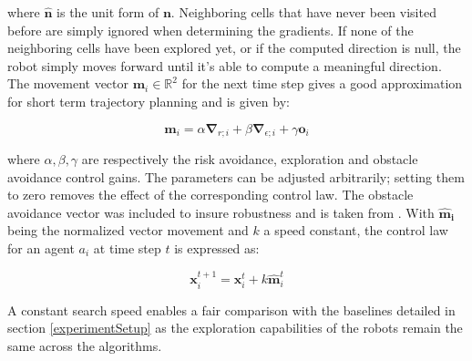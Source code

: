 


where $\bm{\hat{n}}$ is the unit form of $\bm{n}$. Neighboring cells that have never been visited before are simply ignored when determining the gradients. If none of the neighboring cells have been explored yet, or if the computed direction is null, the robot simply moves forward until it's able to compute a meaningful direction. The movement vector $\bm{m}_i \in \mathbb{R}^2$ for the next time step
gives a good approximation for short term trajectory planning and is given by:

\begin{equation}
    \bm{m}_i = \alpha\bm{\nabla}_{r;i} + \beta\bm{\nabla}_{\epsilon;i} + \gamma\bm{o}_i
    \label{eq:movement}
\end{equation}

where $\alpha, \beta, \gamma$ are respectively the risk avoidance,
exploration and obstacle avoidance control gains. The parameters can
be adjusted arbitrarily; setting them to zero removes the effect
of the corresponding control law. The obstacle avoidance vector was
included to insure robustness and is taken from
\cite{shahriari2018lightweight}. With $\bm{\hat{m}_i}$ being the
normalized vector movement and $k$ a speed constant, the control law
for an agent $a_i$ at time step $t$ is expressed as:

\begin{equation}
    \bm{x}_i^{t+1} = \bm{x}_i^t + k \bm{\hat{m}}_i^t
    \label{eq:control}
\end{equation}

A constant search speed enables a fair comparison with the baselines detailed in section \ref{experimentSetup} as the exploration capabilities of the robots remain the same across the algorithms.


